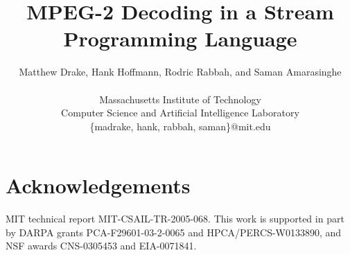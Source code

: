\documentclass[10pt,twocolumn]{article}
\title{MPEG-2 Decoding in a Stream Programming Language}
\author{
  Matthew Drake, Hank Hoffmann, Rodric Rabbah, and Saman Amarasinghe\\
  \begin{twoaffiliations}
    Massachusetts Institute of Technology\\
    Computer Science and Artificial Intelligence Laboratory\\
    \{madrake, hank, rabbah, saman\}@mit.edu
  \end{twoaffiliations}
}
\begin{document}
  
  \maketitle
  \thispagestyle{empty}
  
  \begin{abstract}
    
  \end{abstract}
  
  
  
  
  
  
  
  
  
  \section*{Acknowledgements}
  MIT technical report MIT-CSAIL-TR-2005-068. This work is supported
  in part by DARPA grants PCA-F29601-03-2-0065 and
  HPCA/PERCS-W0133890, and NSF awards CNS-0305453 and EIA-0071841.
  
  
  
  
\end{document}
